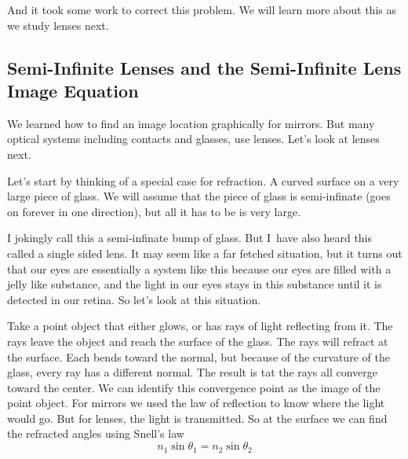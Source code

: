 \documentclass{article}
\begin{document}
And it took some work to correct this problem. We will learn more about this
as we study lenses next.

\subsection{Semi-Infinite Lenses and the Semi-Infinite Lens Image Equation}

We learned how to find an image location graphically for mirrors. But many
optical systems including contacts and glasses, use lenses. Let's look at
lenses next.

Let's start by thinking of a special case for refraction. A curved surface
on a very large piece of glass. We will assume that the piece of glass is
semi-infinate (goes on forever in one direction), but all it has to be is
very large.

I jokingly call this a semi-infinate bump of glass. But I\ have also heard
this called a single sided lens. It may seem like a far fetched situation,
but it turns out that our eyes are essentially a system like this because
our eyes are filled with a jelly like substance, and the light in our eyes
stays in this substance until it is detected in our retina. So let's look at
this situation. 

Take a point object that either glows, or has rays of light reflecting from
it. The rays leave the object and reach the surface of the glass. The rays
will refract at the surface. Each bends toward the normal, but because of
the curvature of the glass, every ray has a different normal. The result is tat the rays all
converge toward the center. We can identify this convergence point as the
image of the point object. For mirrors we used the law of reflection to know
where the light would go. But for lenses, the light is transmitted. So at
the surface we can find the refracted angles using Snell's law%
\[
n_{1}\sin \theta _{1}=n_{2}\sin \theta _{2}
\]
\end{document}
